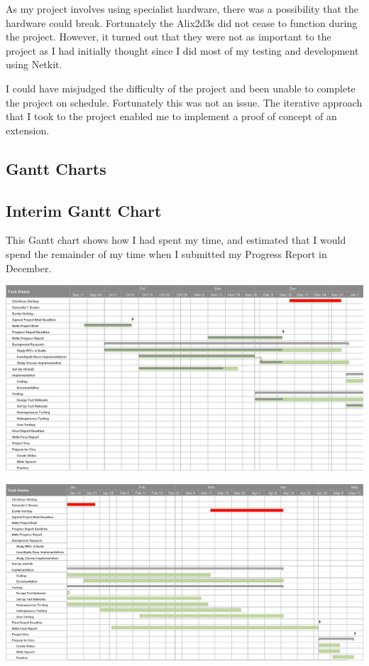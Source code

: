 \documentclass[12pt]{report}
\begin{document}
As my project involves using specialist hardware, there was a possibility that
the hardware could break. Fortunately the Alix2d3s did not cease to function
during the project. However, it turned out that they were not as important to
the project as I had initially thought since I did most of my testing and
development using Netkit.

I could have misjudged the difficulty of the project and been unable to complete
the project on schedule. Fortunately this was not an issue. The iterative
approach that I took to the project enabled me to implement a proof of
concept of an extension.  

\pagebreak
\begin{landscape} 

\section{Gantt Charts}
\subsection{Interim Gantt Chart}
This Gantt chart shows how I had spent my time, and estimated that I would
spend the remainder of my time when I submitted my Progress Report in December. 

\begin{center}
  \includegraphics[width=\linewidth]{../Gantt/GanttPart1.png}
\end{center}

\begin{center}
  \includegraphics[width=\linewidth]{../Gantt/GanttPart2.png}
\end{center}


\end{landscape}
\end{document}
